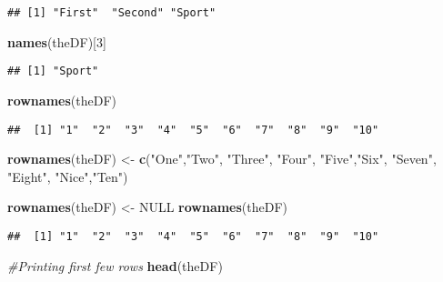 \documentclass[
]{article}
\newenvironment{Shaded}{\begin{snugshade}}{\end{snugshade}}
\newcommand{\CommentTok}[1]{\textcolor[rgb]{0.56,0.35,0.01}{\textit{#1}}}
\newcommand{\ConstantTok}[1]{\textcolor[rgb]{0.56,0.35,0.01}{#1}}
\newcommand{\DecValTok}[1]{\textcolor[rgb]{0.00,0.00,0.81}{#1}}
\newcommand{\FunctionTok}[1]{\textcolor[rgb]{0.13,0.29,0.53}{\textbf{#1}}}
\newcommand{\NormalTok}[1]{#1}
\newcommand{\OtherTok}[1]{\textcolor[rgb]{0.56,0.35,0.01}{#1}}
\newcommand{\StringTok}[1]{\textcolor[rgb]{0.31,0.60,0.02}{#1}}
\begin{document}
\begin{verbatim}
## [1] "First"  "Second" "Sport"
\end{verbatim}

\begin{Shaded}
\begin{Highlighting}[]
\FunctionTok{names}\NormalTok{(theDF)[}\DecValTok{3}\NormalTok{]}
\end{Highlighting}
\end{Shaded}

\begin{verbatim}
## [1] "Sport"
\end{verbatim}

\begin{Shaded}
\begin{Highlighting}[]
\FunctionTok{rownames}\NormalTok{(theDF)}
\end{Highlighting}
\end{Shaded}

\begin{verbatim}
##  [1] "1"  "2"  "3"  "4"  "5"  "6"  "7"  "8"  "9"  "10"
\end{verbatim}

\begin{Shaded}
\begin{Highlighting}[]
\FunctionTok{rownames}\NormalTok{(theDF) }\OtherTok{\textless{}{-}} \FunctionTok{c}\NormalTok{(}\StringTok{"One"}\NormalTok{,}\StringTok{"Two"}\NormalTok{, }\StringTok{"Three"}\NormalTok{, }\StringTok{"Four"}\NormalTok{, }\StringTok{"Five"}\NormalTok{,}\StringTok{"Six"}\NormalTok{, }\StringTok{"Seven"}\NormalTok{, }\StringTok{"Eight"}\NormalTok{, }\StringTok{"Nice"}\NormalTok{,}\StringTok{"Ten"}\NormalTok{)}

\FunctionTok{rownames}\NormalTok{(theDF) }\OtherTok{\textless{}{-}} \ConstantTok{NULL}
\FunctionTok{rownames}\NormalTok{(theDF)}
\end{Highlighting}
\end{Shaded}

\begin{verbatim}
##  [1] "1"  "2"  "3"  "4"  "5"  "6"  "7"  "8"  "9"  "10"
\end{verbatim}

\begin{Shaded}
\begin{Highlighting}[]
\CommentTok{\#Printing first few rows}
\FunctionTok{head}\NormalTok{(theDF)}
\end{Highlighting}
\end{Shaded}
\end{document}
